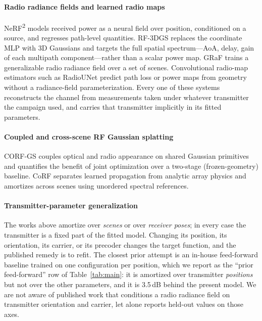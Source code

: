 \documentclass[conference]{IEEEtran}
\begin{document}
\paragraph{Radio radiance fields and learned radio maps}
NeRF\textsuperscript{2} \cite{nerf2} models received power as a neural field
over position, conditioned on a source, and regresses path-level quantities.
RF-3DGS \cite{rf3dgs} replaces the coordinate MLP with 3D Gaussians
\cite{3dgs} and targets the full spatial spectrum---AoA, delay, gain of each
multipath component---rather than a scalar power map. GRaF \cite{graf}
trains a generalizable radio radiance field over a set of scenes. Convolutional
radio-map estimators such as RadioUNet \cite{radiounet} predict path loss or
power maps from geometry without a radiance-field parameterization. Every one of
these systems reconstructs the channel from measurements taken under whatever
transmitter the campaign used, and carries that transmitter implicitly in its
fitted parameters.

\paragraph{Coupled and cross-scene RF Gaussian splatting}
CORF-GS \cite{corfgs} couples optical and radio appearance on shared Gaussian
primitives and quantifies the benefit of joint optimization over a
two-stage (frozen-geometry) baseline. CoRF \cite{corf} separates learned
propagation from analytic array physics and amortizes across scenes using
unordered spectral references.

\paragraph{Transmitter-parameter generalization}
The works above amortize over \emph{scenes} or over \emph{receiver poses}; in
every case the transmitter is a fixed part of the fitted model. Changing its
position, its orientation, its carrier, or its precoder changes the target
function, and the published remedy is to refit. The closest prior attempt is an
in-house feed-forward baseline trained on one configuration per position, which
we report as the ``prior feed-forward'' row of Table~\ref{tab:main}: it is
amortized over transmitter \emph{positions} but not over the other parameters,
and it is 3.5\,dB behind the present model. We are not aware of published work
that conditions a radio radiance field on transmitter orientation and carrier,
let alone reports held-out values on those axes.
\end{document}
